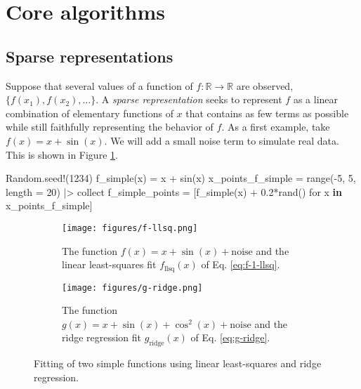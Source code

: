 \documentclass[
]{article}
\newenvironment{Shaded}{\begin{snugshade}}{\end{snugshade}}
\newcommand{\BuiltInTok}[1]{\textcolor[rgb]{0.00,0.23,0.31}{#1}}
\newcommand{\FloatTok}[1]{\textcolor[rgb]{0.68,0.00,0.00}{#1}}
\newcommand{\FunctionTok}[1]{\textcolor[rgb]{0.28,0.35,0.67}{#1}}
\newcommand{\KeywordTok}[1]{\textcolor[rgb]{0.00,0.23,0.31}{\textbf{#1}}}
\newcommand{\NormalTok}[1]{\textcolor[rgb]{0.00,0.23,0.31}{#1}}
\newcommand{\OperatorTok}[1]{\textcolor[rgb]{0.37,0.37,0.37}{#1}}
\begin{document}
\section{Core algorithms}\label{core-algorithms}

\subsection{Sparse representations}\label{sparse-representations}

Suppose that several values of a function of
\(f : \mathbb{R} \to \mathbb{R}\) are observed,
\(\{f(x_1), f(x_2), \dots \}\). A \emph{sparse representation} seeks to
represent \(f\) as a linear combination of elementary functions of \(x\)
that contains as few terms as possible while still faithfully
representing the behavior of \(f\). As a first example, take
\(f(x) = x + \sin(x)\). We will add a small noise term to simulate real
data. This is shown in Figure \ref{fig:f-llsq}.

\begin{Shaded}
\begin{Highlighting}[]
\BuiltInTok{Random}\NormalTok{.}\FunctionTok{seed!}\NormalTok{(}\FloatTok{1234}\NormalTok{)}
\FunctionTok{f\_simple}\NormalTok{(x) }\OperatorTok{=}\NormalTok{ x }\OperatorTok{+} \FunctionTok{sin}\NormalTok{(x)}
\NormalTok{x\_points\_f\_simple }\OperatorTok{=} \FunctionTok{range}\NormalTok{(}\OperatorTok{{-}}\FloatTok{5}\NormalTok{, }\FloatTok{5}\NormalTok{, length }\OperatorTok{=} \FloatTok{20}\NormalTok{) }\OperatorTok{|\textgreater{}}\NormalTok{ collect}
\NormalTok{f\_simple\_points }\OperatorTok{=}\NormalTok{ [}\FunctionTok{f\_simple}\NormalTok{(x) }\OperatorTok{+} \FloatTok{0.2}\FunctionTok{*rand}\NormalTok{() for x }\KeywordTok{in}\NormalTok{ x\_points\_f\_simple]}
\end{Highlighting}
\end{Shaded}

\begin{figure}
\centering
\begin{subfigure}{0.49\textwidth}
    \texttt{[image: figures/f-llsq.png]}
    \caption{The function $f(x) = x + \sin(x) + \text{noise}$ and the linear least-squares fit $f_\text{llsq}(x)$ of Eq. \eqref{eq:f-1-llsq}.}
    \label{fig:f-llsq}
\end{subfigure}
\hfill
\begin{subfigure}{0.49\textwidth}
    \texttt{[image: figures/g-ridge.png]}
    \caption{The function $g(x) = x + \sin(x) + \cos^2(x) + \text{noise}$ and the ridge regression fit $g_\text{ridge}(x)$ of Eq. \eqref{eq:g-ridge}.}
    \label{fig:g-ridge}
\end{subfigure}
        
\caption{Fitting of two simple functions using linear least-squares and ridge regression.}
\label{fig:sparse-motivation}
\end{figure}
\end{document}
